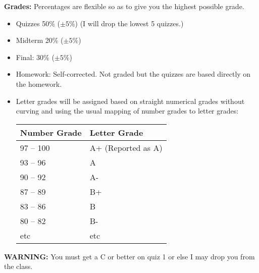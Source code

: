 \documentclass[oneside,12pt]{amsart}
\begin{document}
\textbf{Grades:} Percentages are flexible so as to give you the highest possible grade.
\begin{itemize}
\item Quizzes 50\% ($\pm5\%$) (I will drop the lowest 5 quizzes.)
\item Midterm 20\% ($\pm5\%$)
\item Final: 30\% ($\pm5\%$)
\item Homework: Self-corrected. Not graded but the quizzes are based directly on the homework.
\item Letter grades will be assigned based on straight numerical grades
without curving and using the usual mapping of number grades to letter grades:

\begin{center}
  \begin{tabular}{ | l | l |}
    \hline
    Number Grade & Letter Grade  \\ \hline \hline
    97 -- 100 & A+ (Reported as A) \\ \hline
    93 -- 96 & A\\ \hline
    90 -- 92 & A- \\ \hline
    87 -- 89 & B+ \\ \hline
    83 -- 86 & B \\ \hline
    80 -- 82 & B- \\ \hline
    etc & etc \\ \hline
  \end{tabular}
\end{center}

\end{itemize}

\bigskip

\textbf{WARNING:} You must get a C or better on quiz 1 or else I may drop you from the class.
\end{document}

